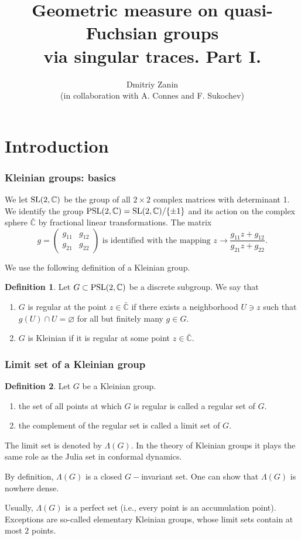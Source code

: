 \documentclass{beamer}
\title[Geometric measure via singular traces]{Geometric measure on quasi-Fuchsian groups\\ via singular traces. Part I.}
\author[Dmitriy Zanin]{Dmitriy Zanin\\
(in collaboration with A. Connes and F. Sukochev)}
\institute[]{University of New South Wales}
\theoremstyle{definition}
\newtheorem{defi}{Definition}
\begin{document}
\begin{frame} 
\titlepage
\end{frame}

\section{Introduction}

\begin{frame}
\frametitle{Kleinian groups: basics}

We let ${\rm SL}(2,\mathbb{C})$ be the group of all $2\times 2$ complex matrices with determinant 1. We identify the group ${\rm PSL}(2,\mathbb{C})={\rm SL}(2,\mathbb{C})/\{\pm 1\}$ and its action on the complex sphere $\bar{\mathbb{C}}$ by fractional linear transformations. The matrix
$$g=
\begin{pmatrix}
g_{11}&g_{12}\\
g_{21}&g_{22}
\end{pmatrix}
\mbox{ is identified with the mapping }
z\to\frac{g_{11}z+g_{12}}{g_{21}z+g_{22}}.$$

We use the following definition of a Kleinian group.

\begin{defi} Let $G\subset {\rm PSL}(2,\mathbb{C})$ be a discrete subgroup. We say that
\begin{enumerate}[{\rm (a)}]
\item $G$ is regular at the point $z\in\bar{\mathbb{C}}$ if there exists a neighborhood $U\ni z$ such that $g(U)\cap U=\varnothing$ for all but finitely many $g\in G.$
\item $G$ is Kleinian if it is regular at some point $z\in\bar{\mathbb{C}}.$
\end{enumerate}
\end{defi}
\end{frame}

\begin{frame}
\frametitle{Limit set of a Kleinian group}

\begin{defi} Let $G$ be a Kleinian group.
\begin{enumerate}[{\rm (a)}]
\item the set of all points at which $G$ is regular is called a regular set of $G.$
\item the complement of the regular set is called a limit set of $G.$
\end{enumerate}
\end{defi}


The limit set is denoted by $\Lambda(G).$ In the theory of Kleinian groups it plays the same role as the Julia set in conformal dynamics.

By definition, $\Lambda(G)$ is a closed $G-$invariant set. One can show that $\Lambda(G)$ is nowhere dense.

Usually, $\Lambda(G)$ is a perfect set (i.e., every point is an accumulation point). Exceptions are so-called elementary Kleinian groups, whose limit sets contain at most $2$ points.
\end{frame}
\end{document}
